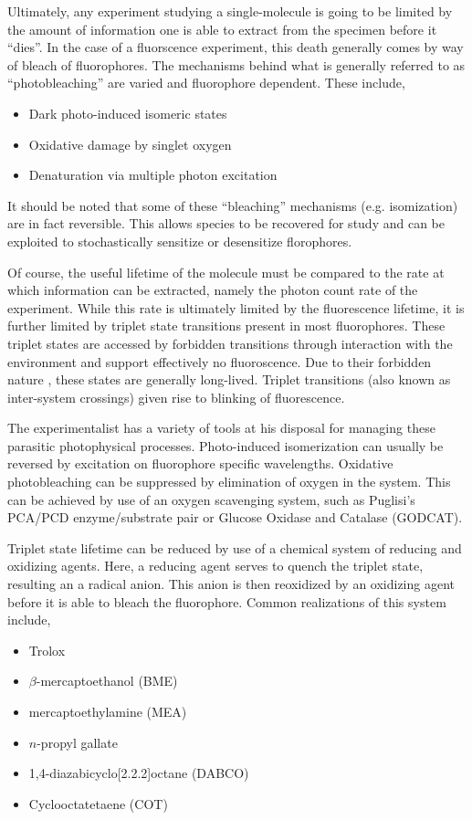 \documentclass{article}
\newcommand{\refneeded}{\todo[color=green!20]{Referenced needed.}}
\begin{document}
Ultimately, any experiment studying a single-molecule is going to be
limited by the amount of information one is able to extract from the
specimen before it ``dies''. In the case of a fluorscence experiment,
this death generally comes by way of bleach of fluorophores. The
mechanisms behind what is generally referred to as ``photobleaching''
are varied and fluorophore dependent. These include,
\begin{itemize}
\item Dark photo-induced isomeric states
\item Oxidative damage by singlet oxygen
\item Denaturation via multiple photon excitation\cite{Deschenes2002}
\end{itemize}
It should be noted that some of these ``bleaching'' mechanisms
(e.g. isomization) are in fact reversible. This allows species to be
recovered for study and can be exploited to stochastically sensitize
or desensitize florophores.

Of course, the useful lifetime of the molecule must be compared to the
rate at which information can be extracted, namely the photon count
rate of the experiment. While this rate is ultimately limited by the
fluorescence lifetime, it is further limited by triplet state transitions
present in most fluorophores. These triplet states are accessed by
forbidden transitions through
interaction with the environment and support effectively no
fluoroscence. Due to their forbidden nature , these states are
generally long-lived. Triplet transitions (also known as inter-system
crossings) given rise to blinking of fluorescence.

The experimentalist has a variety of tools at his disposal for managing
these parasitic photophysical processes. Photo-induced isomerization
can usually be reversed by excitation on fluorophore specific
wavelengths\cite{Fan2011}. Oxidative photobleaching can be suppressed
by elimination of oxygen in the system. This can be achieved by use of
an oxygen scavenging system, such as Puglisi's PCA/PCD
enzyme/substrate pair\cite{Aitkin2008} or Glucose Oxidase and Catalase
(GODCAT)\refneeded.

Triplet state lifetime can be reduced by use of a chemical system of
reducing and oxidizing agents\cite{Vogelsang2008}. Here, a reducing
agent serves to quench the triplet state, resulting an a radical
anion. This anion is then reoxidized by an oxidizing agent before it
is able to bleach the fluorophore. Common realizations of this system
include\cite{Dave2009},
\begin{itemize}
\item Trolox\cite{Rasnik2006}
\item $\beta$-mercaptoethanol (BME)
\item mercaptoethylamine (MEA)
\item $n$-propyl gallate
\item 1,4-diazabicyclo[2.2.2]octane (DABCO)
\item Cyclooctatetaene (COT)
\end{itemize}
\end{document}
